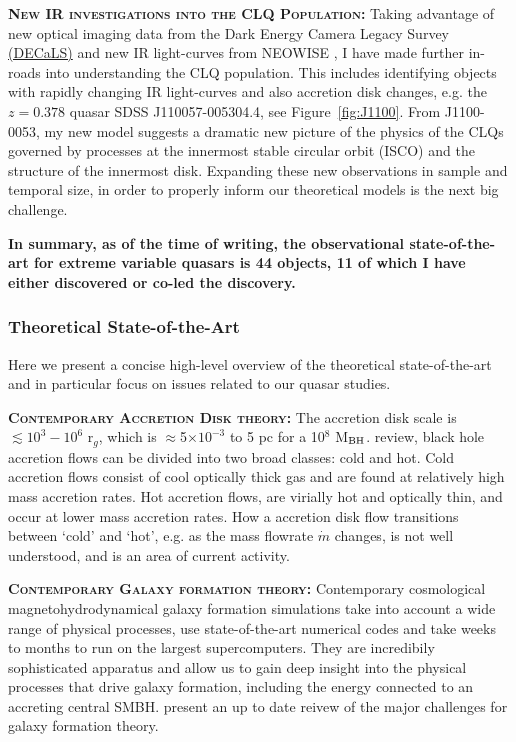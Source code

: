 \smallskip
\smallskip
\noindent
\textbf{\textsc{New IR investigations into the CLQ Population:}}
Taking advantage of new optical imaging data from the Dark Energy
Camera Legacy Survey \href{http://legacysurvey.org/decamls/}{(DECaLS)}
and new IR light-curves from NEOWISE \citep{Meisner2017a,
Meisner2017b}, I have made further in-roads into understanding the CLQ
population. This includes identifying objects with rapidly changing IR
light-curves and also accretion disk changes, e.g. the $z=0.378$
quasar SDSS J110057-005304.4, see Figure~\ref{fig:J1100}. From
J1100-0053, my new model \citep{Ross2018} suggests a dramatic new
picture of the physics of the CLQs governed by processes at the
innermost stable circular orbit (ISCO) and the structure of the
innermost disk. Expanding these new observations in sample and
temporal size, in order to properly inform our theoretical
models is the next big challenge.

\smallskip
\smallskip
\noindent
{\bf In summary, as of the time of writing, the
observational state-of-the-art for extreme variable quasars is 44
objects, 11 of which I have either discovered or co-led the
discovery.}



\subsubsection{Theoretical State-of-the-Art}
Here we present a concise high-level overview of the theoretical
state-of-the-art and in particular focus on issues related to our
quasar studies.

\smallskip 
\smallskip
\noindent 
\textbf{\textsc{Contemporary Accretion Disk theory:}} 
The accretion disk scale is $\lesssim 10^{3}-10^{6}$ r$_{g}$, which is
$\approx$5$\times$$10^{-3}$ to 5 pc for a 10$^{8}$ M$_{\rm
BH}$. \citet{YuanNarayan2014} review, black hole accretion flows can
be divided into two broad classes: cold and hot. Cold accretion flows
consist of cool optically thick gas and are found at relatively high
mass accretion rates.  Hot accretion flows, are virially hot and
optically thin, and occur at lower mass accretion rates.  How a
accretion disk flow transitions between `cold' and `hot', e.g. as the
mass flowrate $\dot{m}$ changes, is not well understood, and is an
area of current activity.


\smallskip 
\smallskip
\noindent 
\textbf{\textsc{Contemporary Galaxy formation theory:}}
Contemporary cosmological magnetohydrodynamical galaxy formation simulations take into account a wide range of physical processes, use state-of-the-art numerical codes and take weeks to months to run on the largest supercomputers.  They are incredibily sophisticated apparatus and allow us to gain deep insight into the physical processes that drive galaxy formation, including the energy connected to an accreting central SMBH. \citet{NaabOstriker2017} present an up to date reivew of the major challenges for galaxy formation theory. 

